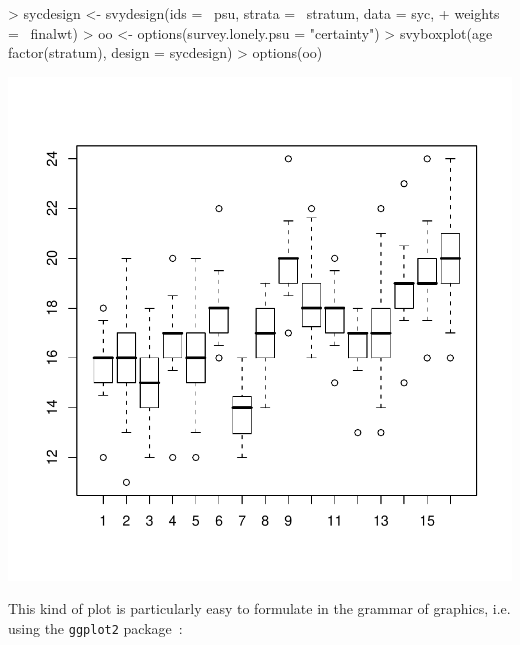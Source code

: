 \documentclass[article, 11pt, oneside]{memoir}
\begin{document}
\begin{Schunk}
\begin{Sinput}
> sycdesign <- svydesign(ids = ~psu, strata = ~stratum, data = syc, 
+     weights = ~finalwt)
> oo <- options(survey.lonely.psu = "certainty")
> svyboxplot(age ~ factor(stratum), design = sycdesign)
> options(oo)
\end{Sinput}
\end{Schunk}
\includegraphics{SDA_using_survey-014}

This kind of plot is particularly easy to formulate
in the grammar of graphics, i.e. using the \texttt{ggplot2}
package~:
\end{document}
